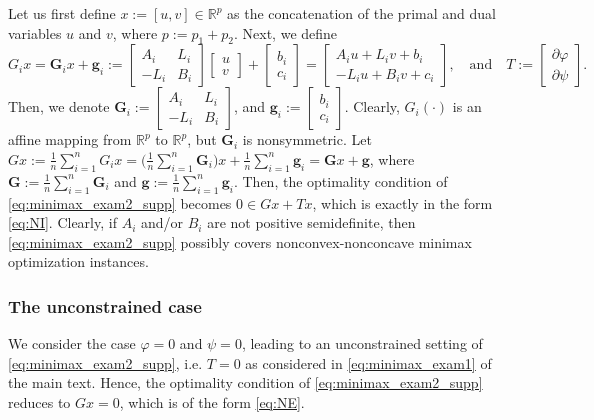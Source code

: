 \documentclass{article}
\newcommand{\R}{\mathbb{R}}
\newcommand{\mbf}[1]{\mathbf{#1}}
\newcommand{\beforesubsubsec}{\vspace{-1.5ex}}
\newcommand{\aftersubsubsec}{\vspace{-1.5ex}}
\theoremstyle{plain}
\theoremstyle{definition}
\theoremstyle{remark}
\begin{document}
Let us first define $x := [u, v] \in \R^p$ as the concatenation of the primal and dual variables $u$ and $v$, where $p := p_1+p_2$.
Next, we define
\begin{equation*}
G_ix = \mathbf{G}_ix + \mbf{g}_i := \begin{bmatrix}A_i & L_i \\ -L_i & B_i\end{bmatrix}\begin{bmatrix}u \\ v\end{bmatrix} + \begin{bmatrix}b_i \\ c_i\end{bmatrix} = \begin{bmatrix}A_iu + L_iv + b_i \\ -L_iu + B_iv + c_i\end{bmatrix}, \quad\text{and} \quad 
T := \begin{bmatrix}\partial{\varphi} \\ \partial{\psi}\end{bmatrix}.
\end{equation*}
Then, we denote $\mathbf{G}_i := \begin{bmatrix}A_i & L_i \\ -L_i & B_i\end{bmatrix}$, and $\mathbf{g}_i :=  \begin{bmatrix}b_i \\ c_i\end{bmatrix}$.
Clearly, $G_i(\cdot)$ is an affine mapping from $\R^p$ to $\R^p$, but $\mathbf{G}_i$ is nonsymmetric.
Let $Gx := \frac{1}{n}\sum_{i=1}^nG_ix = \big(\frac{1}{n}\sum_{i=1}^n\mathbf{G}_i\big)x + \frac{1}{n}\sum_{i=1}^n\mathbf{g}_i = \mathbf{G}x + \mathbf{g}$, where $\mathbf{G} := \frac{1}{n}\sum_{i=1}^n\mathbf{G}_i$ and $\mathbf{g} := \frac{1}{n}\sum_{i=1}^n\mathbf{g}_i$.
Then, the optimality condition of \eqref{eq:minimax_exam2_supp} becomes $0 \in Gx + Tx$, which is exactly in the form \eqref{eq:NI}.
Clearly, if $A_i$ and/or $B_i$ are not positive semidefinite, then \eqref{eq:minimax_exam2_supp} possibly covers nonconvex-nonconcave minimax optimization instances. 

\beforesubsubsec
\subsubsection{The unconstrained case}\label{subsec:exam2_unconstrained}
\aftersubsubsec
We consider the case $\varphi = 0$ and $\psi = 0$, leading to an unconstrained setting of \eqref{eq:minimax_exam2_supp}, i.e. $T = 0$ as considered in  \eqref{eq:minimax_exam1} of the main text.
Hence, the optimality condition of \eqref{eq:minimax_exam2_supp} reduces to $Gx = 0$, which is of the form \eqref{eq:NE}.
\end{document}
